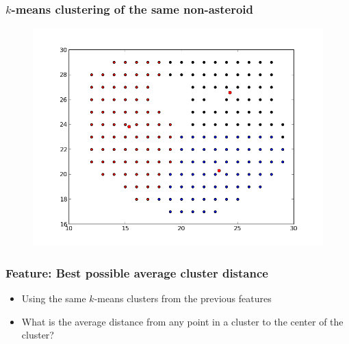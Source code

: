 \documentclass{beamer}
\begin{document}
\begin{frame}
    \frametitle{$k$-means clustering of the same non-asteroid}
    \begin{figure}
        \centering
        \includegraphics[height=0.8\paperheight]{clust-494.png}
    \end{figure}
\end{frame}

\begin{frame}
    \frametitle{Feature: Best possible average cluster distance}
    \begin{itemize}
        \item Using the same $k$-means clusters from the previous features
        \item What is the average distance from any point in a cluster to the
        center of the cluster?
    \end{itemize}
\end{frame}
\end{document}
